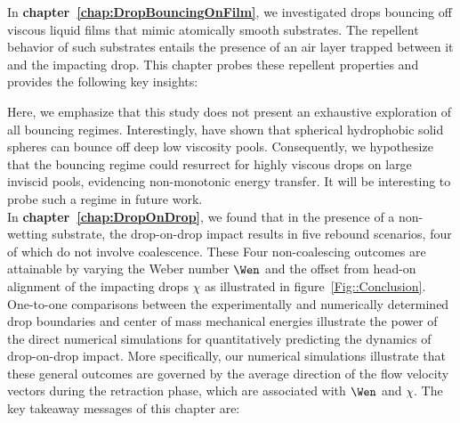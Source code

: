 In \textbf{chapter~\ref{chap:DropBouncingOnFilm}}, we investigated drops bouncing off viscous liquid films that mimic atomically smooth substrates. The repellent behavior of such substrates entails the presence of an air layer trapped between it and the impacting drop. This chapter probes these repellent properties and provides the following key insights:\vspace{2mm}

\vspace{2mm}

Here, we emphasize that this study does not present an exhaustive exploration of all bouncing regimes. Interestingly, \citet{galeano2021capillary} have shown that spherical hydrophobic solid spheres can bounce off deep low viscosity pools. Consequently, we hypothesize that the bouncing regime could resurrect for highly viscous drops on large inviscid pools, evidencing non-monotonic energy transfer. It will be interesting to probe such a regime in future work.\\

In \textbf{chapter~\ref{chap:DropOnDrop}}, we found that in the presence of a non-wetting substrate, the drop-on-drop impact results in five rebound scenarios, four of which do not involve coalescence. These Four non-coalescing outcomes are attainable by varying the Weber number $\Wen$ and the offset from head-on alignment of the impacting drops $\chi$ as illustrated in figure~\ref{Fig::Conclusion}. One-to-one comparisons between the experimentally and numerically determined drop boundaries and center of mass mechanical energies illustrate the power of the direct numerical simulations for quantitatively predicting the dynamics of drop-on-drop impact. More specifically, our numerical simulations illustrate that these general outcomes are governed by the average direction of the flow velocity vectors during the retraction phase, which are associated with $\Wen$ and $\chi$. The key takeaway messages of this chapter are:\vspace{2mm}

